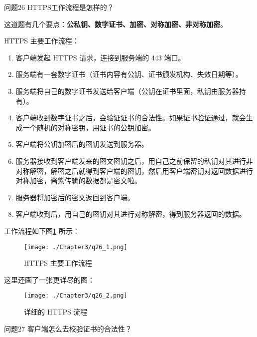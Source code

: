\documentclass[cn,11pt,color=blue,lang=cn]{elegantbook}
\begin{document}
\begin{custom}{问题26}
HTTPS工作流程是怎样的？
\end{custom}

\begin{solution}
这道题有几个要点：\textbf{公私钥、数字证书、加密、对称加密、非对称加密}。

HTTPS 主要工作流程：
\begin{enumerate}
	\item 客户端发起 HTTPS 请求，连接到服务端的 443 端口。
	\item 服务端有一套数字证书（证书内容有公钥、证书颁发机构、失效日期等）。
	\item 服务端将自己的数字证书发送给客户端（公钥在证书里面，私钥由服务器持有）。
	\item 客户端收到数字证书之后，会验证证书的合法性。如果证书验证通过，就会生成一个随机的对称密钥，用证书的公钥加密。
	\item 客户端将公钥加密后的密钥发送到服务器。
	\item 服务器接收到客户端发来的密文密钥之后，用自己之前保留的私钥对其进行非对称解密，解密之后就得到客户端的密钥，然后用客户端密钥对返回数据进行对称加密，酱紫传输的数据都是密文啦。
	\item 服务器将加密后的密文返回到客户端。
	\item 客户端收到后，用自己的密钥对其进行对称解密，得到服务器返回的数据。
\end{enumerate}
工作流程如下图\ref{fig26_1} 所示：
\begin{figure}[htbp]
\centering
\texttt{[image: ./Chapter3/q26\_1.png]}
\caption{HTTPS 主要工作流程}
\label{fig26_1}
\end{figure}

这里还画了一张更详尽的图：
\begin{figure}[htbp]
\centering
\texttt{[image: ./Chapter3/q26\_2.png]}
\caption{详细的 HTTPS 流程}
\label{fig26_2}
\end{figure}

\end{solution}

\begin{custom}{问题27}
客户端怎么去校验证书的合法性？
\end{custom}
\end{document}
